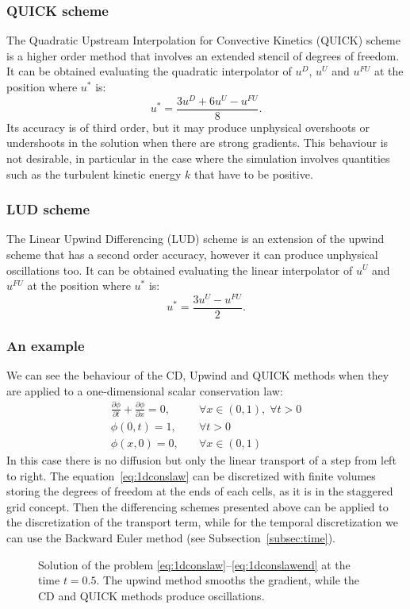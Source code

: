\subsubsection{QUICK scheme}
The Quadratic Upstream Interpolation for Convective Kinetics (QUICK) scheme 
\cite{fv:leonard} is a higher order method that involves an extended stencil 
of degrees of freedom. It can be obtained evaluating the quadratic interpolator 
of $u^D$, $u^U$ and 
$u^{FU}$ at the position where $u^*$ is:
\begin{equation} \label{eq:quick}
	u^* = \frac{3u^D + 6u^U - u^{FU}}{8}.
\end{equation}
Its accuracy is of third order, but it may produce unphysical overshoots or 
undershoots in the solution when there are strong gradients. This behaviour is 
not desirable, in particular in the case where the simulation involves 
quantities such as the turbulent kinetic energy $k$ that have to be positive. 
%
\subsubsection{LUD scheme}
The Linear Upwind Differencing (LUD) scheme is an extension of the upwind 
scheme that has a second order accuracy, however it can produce unphysical 
oscillations too. It can be obtained evaluating the linear interpolator of $u^U$ 
and 
$u^{FU}$ at the position where $u^*$ is:
\begin{equation} \label{eq:lud}
u^* = \frac{3u^U - u^{FU}}{2}.
\end{equation}
%
\subsubsection{An example}
We can see the behaviour of the CD, Upwind and QUICK methods when they are 
applied to a one-dimensional scalar conservation law:
\begin{align}
	\label{eq:1dconslaw} \frac{\partial \phi}{\partial t} + \frac{\partial 
	\phi}{\partial x} = 0, 
	\quad &\forall x \in (0, 1), \; \forall t > 0\\
	\phi(0, t) = 1, \quad &\forall t>0\\
	\label{eq:1dconslawend}\phi(x, 0) = 0, \quad &\forall x \in (0,1)
\end{align}
In this case there is no diffusion but only the linear transport of a step from 
left to right. The equation~\eqref{eq:1dconslaw} can be discretized with finite 
volumes storing the degrees of freedom at the ends of each cells, as it is in 
the staggered grid concept. Then the differencing schemes presented above can 
be applied to the discretization of the transport term, while for the temporal 
discretization we can use the Backward Euler method (see 
Subsection~\ref{subsec:time}).
\begin{figure}[t]
	\centering
	
	\caption[Solution of a one-dimensional scalar conservation law]{Solution of 
	the problem \eqref{eq:1dconslaw}--\eqref{eq:1dconslawend} at the time 
	$t=0.5$. The upwind method smooths the gradient, while the CD and QUICK 
	methods produce oscillations.}
	\label{fig:1dconslaw}
\end{figure}

